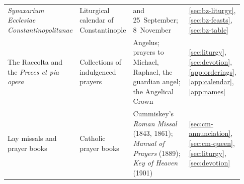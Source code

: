 \begin{longtable}{@{}>{\raggedright\arraybackslash}p{0.21\linewidth}>{\raggedright\arraybackslash}p{0.20\linewidth}>{\raggedright\arraybackslash}p{0.35\linewidth}>{\raggedright\arraybackslash}p{0.17\linewidth}@{}}
\emph{Synaxarium Ecclesiae Constantinopolitanae} & Liturgical calendar of Constantinople & 6 and 25~September; 8~November & \ref{sec:bz-liturgy}, \ref{sec:bz-feasts}, \ref{sec:bz-table}\\
The Raccolta and the \emph{Preces et pia opera} & Collections of indulgenced prayers & Angelus; prayers to Michael, Raphael, the guardian angel; the Angelical Crown & \ref{sec:liturgy}, \ref{sec:devotion}, \ref{app:orderings}, \ref{app:calendar}, \ref{app:names}\\
Lay missals and prayer books & Catholic prayer books & Cummiskey's \emph{Roman Missal} (1843, 1861); \emph{Manual of Prayers} (1889); \emph{Key of Heaven} (1901) & \ref{sec:cm-annunciation}, \ref{sec:cm-queen}, \ref{sec:liturgy}, \ref{sec:devotion}\\
\end{longtable}
\endgroup
